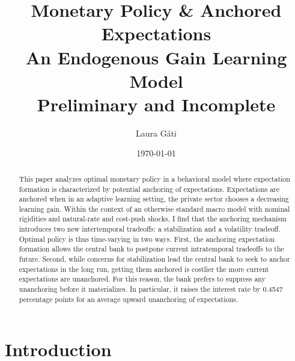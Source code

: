 \documentclass[11pt]{article}
\renewcommand{\[}{\begin{equation}}
\renewcommand{\]}{\end{equation}}
\begin{document}
\title{Monetary Policy \& Anchored Expectations \\
An Endogenous Gain Learning Model \\
\vspace{0.8cm}
\small{Preliminary and Incomplete}}
\author{Laura G\'ati} 
\date{\today}
\maketitle


\begin{abstract}
This paper analyzes optimal monetary policy in a behavioral model where expectation formation is characterized by potential anchoring of expectations. Expectations are anchored when in an adaptive learning setting, the private sector chooses a decreasing learning gain. Within the context of an otherwise standard macro model with nominal rigidities and natural-rate and cost-push shocks, I find that the anchoring mechanism introduces two new intertemporal tradeoffs: a stabilization and a volatility tradeoff. Optimal policy is thus time-varying in two ways. First, the anchoring expectation formation allows the central bank to postpone current intratemporal tradeoffs to the future. Second, while concerns for stabilization lead the central bank to seek to anchor expectations in the long run, getting them anchored is costlier the more current expectations are unanchored. For this reason, the bank prefers to suppress any unanchoring before it materializes. In particular, it raises the interest rate by 0.4547 percentage points for an average upward unanchoring of expectations. 
\end{abstract}





\newpage
\section{Introduction}\label{introduction}
\end{document}
